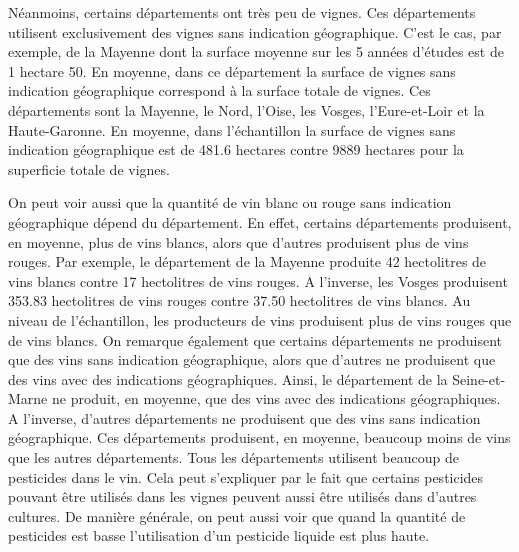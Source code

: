 \documentclass[11pt, a4paper]{article}
\begin{document}
Néanmoins, certains départements ont très peu de vignes. 
Ces départements utilisent exclusivement des vignes sans indication géographique. 
C’est le cas, par exemple, de la Mayenne dont la surface moyenne sur les 5 années d’études est de 1 hectare 50. 
En moyenne, dans ce département la surface de vignes sans indication géographique correspond à la surface totale de vignes. 
Ces départements sont la Mayenne, le Nord, l’Oise, les Vosges, l’Eure-et-Loir et la Haute-Garonne. 
En moyenne, dans l’échantillon la surface de vignes sans indication géographique est de 481.6 hectares contre 9889 hectares pour la superficie totale de vignes.
\par
On peut voir aussi que la quantité de vin blanc ou rouge sans indication géographique dépend du département. 
En effet, certains départements produisent, en moyenne, plus de vins blancs, alors que d’autres produisent plus de vins rouges. Par exemple, le département de la Mayenne produite 42 hectolitres de vins blancs contre 17 hectolitres de vins rouges. 
A l’inverse, les Vosges produisent 353.83 hectolitres de vins rouges contre 37.50 hectolitres de vins blancs. 
Au niveau de l’échantillon, les producteurs de vins produisent plus de vins rouges que de vins blancs.  
On remarque également que certains départements ne produisent que des vins sans indication géographique, alors que d’autres ne produisent que des vins avec des indications géographiques. 
Ainsi, le département de la Seine-et-Marne ne produit, en moyenne, que des vins avec des indications géographiques. 
A l’inverse, d’autres départements ne produisent que des vins sans indication géographique. 
Ces départements produisent, en moyenne, beaucoup moins de vins que les autres départements. 
Tous les départements utilisent beaucoup de pesticides dans le vin. 
Cela peut s’expliquer par le fait que certains pesticides pouvant être utilisés dans les vignes peuvent aussi être utilisés dans d’autres cultures. 
De manière générale, on peut aussi voir que quand la quantité de pesticides est basse l’utilisation d’un pesticide liquide est plus haute.
\end{document}

